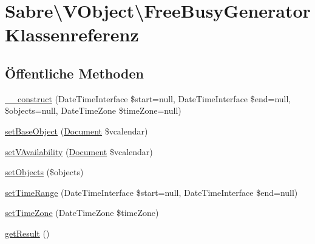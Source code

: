 \hypertarget{class_sabre_1_1_v_object_1_1_free_busy_generator}{}\section{Sabre\textbackslash{}V\+Object\textbackslash{}Free\+Busy\+Generator Klassenreferenz}
\label{class_sabre_1_1_v_object_1_1_free_busy_generator}
\subsection*{Öffentliche Methoden}
\begin{DoxyCompactItemize}
\item 
\mbox{\hyperlink{class_sabre_1_1_v_object_1_1_free_busy_generator_aabe9ecba310f075be685069d95d7eb2e}{\+\_\+\+\_\+construct}} (Date\+Time\+Interface \$start=null, Date\+Time\+Interface \$end=null, \$objects=null, Date\+Time\+Zone \$time\+Zone=null)
\item 
\mbox{\hyperlink{class_sabre_1_1_v_object_1_1_free_busy_generator_a4434b3089a5bbc1c74adeed2406eaee7}{set\+Base\+Object}} (\mbox{\hyperlink{class_sabre_1_1_v_object_1_1_document}{Document}} \$vcalendar)
\item 
\mbox{\hyperlink{class_sabre_1_1_v_object_1_1_free_busy_generator_a415e1d7badd04b14a82a66d46422ffca}{set\+V\+Availability}} (\mbox{\hyperlink{class_sabre_1_1_v_object_1_1_document}{Document}} \$vcalendar)
\item 
\mbox{\hyperlink{class_sabre_1_1_v_object_1_1_free_busy_generator_a5d68838b8d970c45f09b6e863bbcc0d4}{set\+Objects}} (\$objects)
\item 
\mbox{\hyperlink{class_sabre_1_1_v_object_1_1_free_busy_generator_abf94767db5f35fff4b03cdf5b3153f89}{set\+Time\+Range}} (Date\+Time\+Interface \$start=null, Date\+Time\+Interface \$end=null)
\item 
\mbox{\hyperlink{class_sabre_1_1_v_object_1_1_free_busy_generator_a9d85c6c68fbbc19c59e5ab5c186a78d9}{set\+Time\+Zone}} (Date\+Time\+Zone \$time\+Zone)
\item 
\mbox{\hyperlink{class_sabre_1_1_v_object_1_1_free_busy_generator_afd8379ece4d169f0960a785d2a165d5b}{get\+Result}} ()
\end{DoxyCompactItemize}
